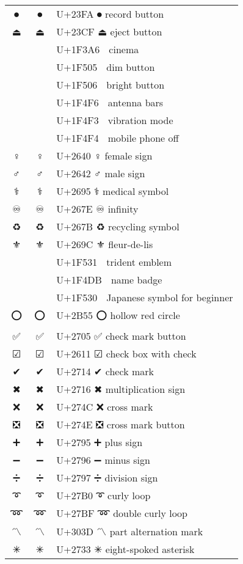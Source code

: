 \documentclass[a4paper,12pt]{article}
\newcommand{\fontA}[1]{{\fontspec[RawFeature={mode=harf,+dist,+ccmp}]{Segoe UI Emoji} #1}}
\newcommand{\fontB}[1]{{\fontspec[RawFeature={mode=harf,+dist,+ccmp}]{Noto Color Emoji} #1}}
\begin{document}
\begin{longtable}[c]{ccp{0.8\linewidth}}
\fontA{⏺}&\fontB{⏺}&U+23FA ⏺ record button\\
\fontA{⏏}&\fontB{⏏}&U+23CF ⏏ eject button\\
\fontA{🎦}&\fontB{🎦}&U+1F3A6 🎦 cinema\\
\fontA{🔅}&\fontB{🔅}&U+1F505 🔅 dim button\\
\fontA{🔆}&\fontB{🔆}&U+1F506 🔆 bright button\\
\fontA{📶}&\fontB{📶}&U+1F4F6 📶 antenna bars\\
\fontA{📳}&\fontB{📳}&U+1F4F3 📳 vibration mode\\
\fontA{📴}&\fontB{📴}&U+1F4F4 📴 mobile phone off\\
\fontA{♀}&\fontB{♀}&U+2640 ♀ female sign\\
\fontA{♂}&\fontB{♂}&U+2642 ♂ male sign\\
\fontA{⚕}&\fontB{⚕}&U+2695 ⚕ medical symbol\\
\fontA{♾}&\fontB{♾}&U+267E ♾ infinity\\
\fontA{♻}&\fontB{♻}&U+267B ♻ recycling symbol\\
\fontA{⚜}&\fontB{⚜}&U+269C ⚜ fleur-de-lis\\
\fontA{🔱}&\fontB{🔱}&U+1F531 🔱 trident emblem\\
\fontA{📛}&\fontB{📛}&U+1F4DB 📛 name badge\\
\fontA{🔰}&\fontB{🔰}&U+1F530 🔰 Japanese symbol for beginner\\
\fontA{⭕}&\fontB{⭕}&U+2B55 ⭕ hollow red circle\\
\fontA{✅}&\fontB{✅}&U+2705 ✅ check mark button\\
\fontA{☑}&\fontB{☑}&U+2611 ☑ check box with check\\
\fontA{✔}&\fontB{✔}&U+2714 ✔ check mark\\
\fontA{✖}&\fontB{✖}&U+2716 ✖ multiplication sign\\
\fontA{❌}&\fontB{❌}&U+274C ❌ cross mark\\
\fontA{❎}&\fontB{❎}&U+274E ❎ cross mark button\\
\fontA{➕}&\fontB{➕}&U+2795 ➕ plus sign\\
\fontA{➖}&\fontB{➖}&U+2796 ➖ minus sign\\
\fontA{➗}&\fontB{➗}&U+2797 ➗ division sign\\
\fontA{➰}&\fontB{➰}&U+27B0 ➰ curly loop\\
\fontA{➿}&\fontB{➿}&U+27BF ➿ double curly loop\\
\fontA{〽}&\fontB{〽}&U+303D 〽 part alternation mark\\
\fontA{✳}&\fontB{✳}&U+2733 ✳ eight-spoked asterisk\\

\end{longtable}
\end{document}
